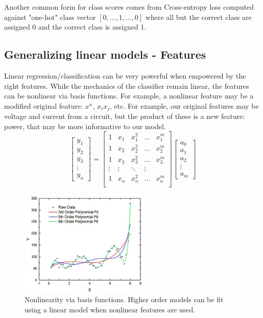 \documentclass[twoside]{article}
\begin{document}
Another common form for class scores comes from Cross-entropy loss computed against "one-hot" class vector $[0,...,1,...,0]$ where all but the correct class are assigned 0 and the correct class is assigned 1.\newline

\subsection{Generalizing linear models - Features}
Linear regression/classification can be very powerful when empowered by the right features. While the mechanics of the classifier remain linear, the features can be nonlinear via basis functions. For example, a nonlinear feature may be a modified original feature: $x^n$, $x_ix_j$, etc. For example, our original features may be voltage and current from a circuit, but the product of these is a new feature: power, that may be more informative to our model.\newline
\[
\begin{bmatrix}
    y_1 \\
    y_2 \\
    y_3 \\
    \vdots \\
    y_n
\end{bmatrix}
= 
\begin{bmatrix}
    1 & x_1 & x_1^2 & \dots & x_1^m\\
    1 & x_2 & x_2^2 & \dots & x_2^m\\
    1 & x_3 & x_3^2 & \dots & x_3^m\\
    \vdots & \vdots & \ddots & \vdots\\
    1 & x_n & x_n^2 & \dots & x_n^m\\     
\end{bmatrix} 
\begin{bmatrix}
    a_0 \\
    a_1  \\
    a_2 \\
    \vdots \\
    a_m      
\end{bmatrix}
\]
\begin{figure}[H]
\centering
\includegraphics[height = 2in]{pics/lecture_8_generalized_models.jpg}
\caption{Nonlinearity via basis functions. Higher order models can be fit using a linear model when nonlinear features are used.}
\end{figure}
\end{document}
